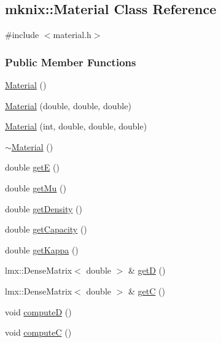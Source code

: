 \hypertarget{classmknix_1_1_material}{\subsection{mknix\-:\-:Material Class Reference}
\label{classmknix_1_1_material}
}


{\ttfamily \#include $<$material.\-h$>$}

\subsubsection*{Public Member Functions}
\begin{DoxyCompactItemize}
\item 
\hyperlink{classmknix_1_1_material_a6bfec89c033e42c81479ffeb2cfca33b}{Material} ()
\item 
\hyperlink{classmknix_1_1_material_a1f5cfec4e49a4dbfba8ccd2d2b3ac6c9}{Material} (double, double, double)
\item 
\hyperlink{classmknix_1_1_material_a10a6d06e979d85892c01fe59c908d06d}{Material} (int, double, double, double)
\item 
\hyperlink{classmknix_1_1_material_ab0c23c9dfb7119afa0f20e912d4af6e6}{$\sim$\-Material} ()
\item 
double \hyperlink{classmknix_1_1_material_a5e0f78fc32bea9435b20f6583de1c1e6}{get\-E} ()
\item 
double \hyperlink{classmknix_1_1_material_ae9162080889d12bd5f8759b4efce2e1e}{get\-Mu} ()
\item 
double \hyperlink{classmknix_1_1_material_a65d3c9fb96d96ba179c9e4c3c68b814b}{get\-Density} ()
\item 
double \hyperlink{classmknix_1_1_material_af9d29d92b850bb0a3e2ebb8ed01261b2}{get\-Capacity} ()
\item 
double \hyperlink{classmknix_1_1_material_afc5fe69937d640e9380f62f2614424c8}{get\-Kappa} ()
\item 
lmx\-::\-Dense\-Matrix$<$ double $>$ \& \hyperlink{classmknix_1_1_material_a043208ee829f606a01ca631ed14afaf3}{get\-D} ()
\item 
lmx\-::\-Dense\-Matrix$<$ double $>$ \& \hyperlink{classmknix_1_1_material_a7005a08df113237a9cb6d36959bb9d25}{get\-C} ()
\item 
void \hyperlink{classmknix_1_1_material_a134d81df672beb86b49b23dc0ac8cfe7}{compute\-D} ()
\item 
void \hyperlink{classmknix_1_1_material_a30503f7c95cd5f7410836224b9e66c19}{compute\-C} ()

\end{DoxyCompactItemize}
